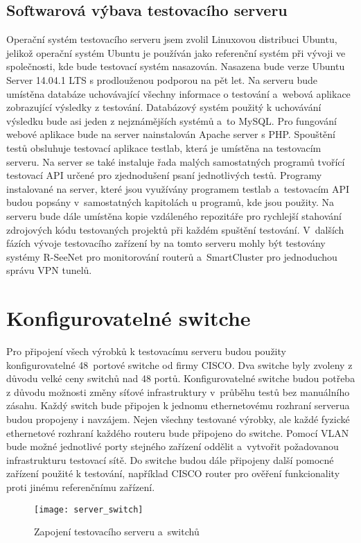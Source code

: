 \subsection{Softwarová výbava testovacího serveru}
Operační systém testovacího serveru jsem zvolil Linuxovou distribuci Ubuntu, jelikož operační systém Ubuntu je používán jako referenční systém při vývoji ve společnosti, kde bude testovací systém nasazován. Nasazena bude verze Ubuntu Server 14.04.1 LTS s prodlouženou podporou na pět let. Na serveru bude umístěna databáze uchovávající všechny informace o testování a~webová aplikace zobrazující výsledky z testování. Databázový systém použitý k uchovávání výsledku bude asi jeden z nejznámějších systémů a~to MySQL. Pro fungování webové aplikace bude na server nainstalován Apache server s PHP. Spouštění testů obsluhuje testovací aplikace testlab, která je umístěna na testovacím serveru. Na server se také instaluje řada malých samostatných programů tvořící testovací API určené pro zjednodušení psaní jednotlivých testů. Programy instalované na server, které jsou využívány programem testlab a~testovacím API budou popsány v~samostatných kapitolách u programů, kde jsou použity. Na serveru bude dále umístěna kopie vzdáleného repozitáře pro rychlejší stahování zdrojových kódu testovaných projektů při každém spuštění testování. V~dalších fázích vývoje testovacího zařízení by na tomto serveru mohly být testovány systémy R-SeeNet pro monitorování routerů a~SmartCluster pro jednoduchou správu VPN tunelů.

\section{Konfigurovatelné switche}
Pro připojení všech výrobků k testovacímu serveru budou použity konfigurovatelné 48~portové switche od firmy CISCO. Dva switche byly zvoleny z důvodu velké ceny switchů nad 48 portů. Konfigurovatelné switche budou potřeba z důvodu možnosti změny síťové infrastruktury v~průběhu testů bez manuálního zásahu. Každý switch bude připojen k jednomu ethernetovému rozhraní serverua budou propojeny i navzájem. Nejen všechny testované výrobky, ale každé fyzické ethernetové rozhraní každého routeru bude připojeno do switche. Pomocí VLAN bude možné jednotlivé porty stejného zařízení oddělit a~vytvořit požadovanou infrastrukturu testovací sítě. Do switche budou dále připojeny další pomocné zařízení použité k testování, například CISCO router pro ověření funkcionality proti jinému referenčnímu zařízení.

\begin{figure}[h]
  \centering
  \texttt{[image: server\_switch]}
  \caption{Zapojení testovacího serveru a~switchů}
  \label{fig:server_switch}
\end{figure}

